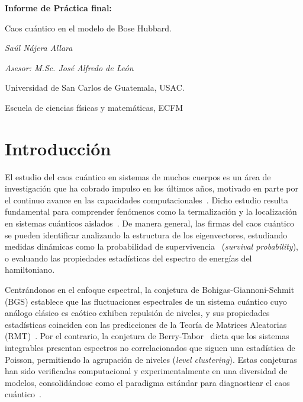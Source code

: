 \documentclass[10pt,a4paper]{article}
\begin{document}
\begin{titlepage}
    \centering
    \vspace*{1cm}
    
    {\huge\bfseries Informe de Práctica final: \par}
    \vspace{0.5cm}
    {\Large Caos cuántico en el modelo de Bose Hubbard. \par}
    
    \vspace{1.5cm}
    
    {\Large\textit{Saúl Nájera Allara} \par}
    {\Large\textit{Asesor: M.Sc. José Alfredo de León} \par}
    
    \vspace{3cm}
    
    
    \vfill
    
    {\large Universidad de San Carlos de Guatemala, USAC. \par}
    {\large Escuela de ciencias físicas y matemáticas, ECFM \par}
    \vspace{0.5cm}
\end{titlepage}
\section{Introducción}
El estudio del caos cuántico en sistemas de muchos cuerpos es un área de investigación que ha cobrado impulso en los últimos años, motivado en parte por el continuo avance en las capacidades computacionales~\cite{dalessio2016quantum}. Dicho estudio resulta fundamental para comprender fenómenos como la termalización y la localización en sistemas cuánticos aislados~\cite{Zhang2010, nandkishore2015many}. De manera general, las firmas del caos cuántico se pueden identificar analizando la estructura de los eigenvectores, estudiando medidas dinámicas como la probabilidad de supervivencia~\cite{delacruz2020quantum} (\textit{survival probability}), o evaluando las propiedades estadísticas del espectro de energías del hamiltoniano.

Centrándonos en el enfoque espectral, la conjetura de Bohigas-Giannoni-Schmit (BGS) establece que las fluctuaciones espectrales de un sistema cuántico cuyo análogo clásico es caótico exhiben repulsión de niveles, y sus propiedades estadísticas coinciden con las predicciones de la Teoría de Matrices Aleatorias (RMT)~\cite{Bohigas_1984}. Por el contrario, la conjetura de Berry-Tabor~\cite{BerryTabor1977} dicta que los sistemas integrables presentan espectros no correlacionados que siguen una estadística de Poisson, permitiendo la agrupación de niveles (\textit{level clustering}). Estas conjeturas han sido verificadas computacional y experimentalmente en una diversidad de modelos, consolidándose como el paradigma estándar para diagnosticar el caos cuántico~\cite{guhr1998random}.
\end{document}

